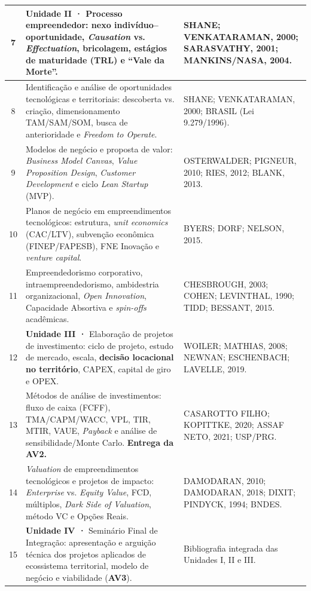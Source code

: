 \documentclass[11pt,a4paper]{article}
\begin{document}
\begin{longtable}{|c|p{8.5cm}|p{5.8cm}|}
\hline
7 & \textbf{Unidade II ·} Processo empreendedor: nexo indivíduo--oportunidade, \textit{Causation} vs. \textit{Effectuation}, bricolagem, estágios de maturidade (TRL) e ``Vale da Morte''. & SHANE; VENKATARAMAN, 2000; SARASVATHY, 2001; MANKINS/NASA, 2004. \\
\hline
8 & Identificação e análise de oportunidades tecnológicas e territoriais: descoberta vs. criação, dimensionamento TAM/SAM/SOM, busca de anterioridade e \textit{Freedom to Operate}. & SHANE; VENKATARAMAN, 2000; BRASIL (Lei 9.279/1996). \\
\hline
9 & Modelos de negócio e proposta de valor: \textit{Business Model Canvas}, \textit{Value Proposition Design}, \textit{Customer Development} e ciclo \textit{Lean Startup} (MVP). & OSTERWALDER; PIGNEUR, 2010; RIES, 2012; BLANK, 2013. \\
\hline
10 & Planos de negócio em empreendimentos tecnológicos: estrutura, \textit{unit economics} (CAC/LTV), subvenção econômica (FINEP/FAPESB), FNE Inovação e \textit{venture capital}. & BYERS; DORF; NELSON, 2015. \\
\hline
11 & Empreendedorismo corporativo, intraempreendedorismo, ambidestria organizacional, \textit{Open Innovation}, Capacidade Absortiva e \textit{spin-offs} acadêmicas. & CHESBROUGH, 2003; COHEN; LEVINTHAL, 1990; TIDD; BESSANT, 2015. \\
\hline
12 & \textbf{Unidade III ·} Elaboração de projetos de investimento: ciclo de projeto, estudo de mercado, escala, \textbf{decisão locacional no território}, CAPEX, capital de giro e OPEX. & WOILER; MATHIAS, 2008; NEWNAN; ESCHENBACH; LAVELLE, 2019. \\
\hline
13 & Métodos de análise de investimentos: fluxo de caixa (FCFF), TMA/CAPM/WACC, VPL, TIR, MTIR, VAUE, \textit{Payback} e análise de sensibilidade/Monte Carlo. \textbf{Entrega da AV2.} & CASAROTTO FILHO; KOPITTKE, 2020; ASSAF NETO, 2021; USP/PRG. \\
\hline
14 & \textit{Valuation} de empreendimentos tecnológicos e projetos de impacto: \textit{Enterprise} vs. \textit{Equity Value}, FCD, múltiplos, \textit{Dark Side of Valuation}, método VC e Opções Reais. & DAMODARAN, 2010; DAMODARAN, 2018; DIXIT; PINDYCK, 1994; BNDES. \\
\hline
15 & \textbf{Unidade IV ·} Seminário Final de Integração: apresentação e arguição técnica dos projetos aplicados de ecossistema territorial, modelo de negócio e viabilidade (\textbf{AV3}). & Bibliografia integrada das Unidades I, II e III. \\
\hline
\end{longtable}
\end{document}
